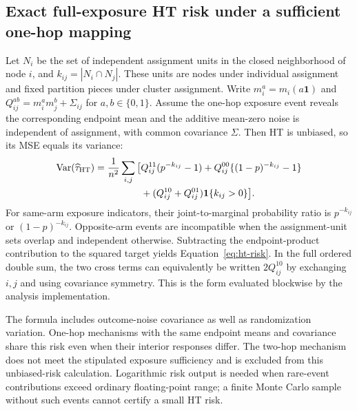 \subsection{Exact full-exposure HT risk under a sufficient one-hop mapping}
\label{app:ht-risk}
Let $N_i$ be the set of independent assignment units in the closed neighborhood of node $i$, and $k_{ij}=|N_i\cap N_j|$. These units are nodes under individual assignment and fixed partition pieces under cluster assignment. Write $m_i^a=m_i(a\mathbf 1)$ and $Q_{ij}^{ab}=m_i^a m_j^b+\Sigma_{ij}$ for $a,b\in\{0,1\}$. Assume the one-hop exposure event reveals the corresponding endpoint mean and the additive mean-zero noise is independent of assignment, with common covariance $\Sigma$. Then HT is unbiased, so its MSE equals its variance:
\begin{align}
 \operatorname{Var}(\widehat\tau_{\rm HT})=\frac1{n^2}\sum_{i,j}\big[&Q_{ij}^{11}(p^{-k_{ij}}-1)
 +Q_{ij}^{00}\{(1-p)^{-k_{ij}}-1\}\nonumber\\
 &+(Q_{ij}^{10}+Q_{ij}^{01})\mathbf 1\{k_{ij}>0\}\big].
 \label{eq:ht-risk}
\end{align}
For same-arm exposure indicators, their joint-to-marginal probability ratio is $p^{-k_{ij}}$ or $(1-p)^{-k_{ij}}$. Opposite-arm events are incompatible when the assignment-unit sets overlap and independent otherwise. Subtracting the endpoint-product contribution to the squared target yields Equation~\eqref{eq:ht-risk}. In the full ordered double sum, the two cross terms can equivalently be written $2Q_{ij}^{10}$ by exchanging $i,j$ and using covariance symmetry. This is the form evaluated blockwise by the analysis implementation.

The formula includes outcome-noise covariance as well as randomization variation. One-hop mechanisms with the same endpoint means and covariance share this risk even when their interior responses differ. The two-hop mechanism does not meet the stipulated exposure sufficiency and is excluded from this unbiased-risk calculation. Logarithmic risk output is needed when rare-event contributions exceed ordinary floating-point range; a finite Monte Carlo sample without such events cannot certify a small HT risk.
